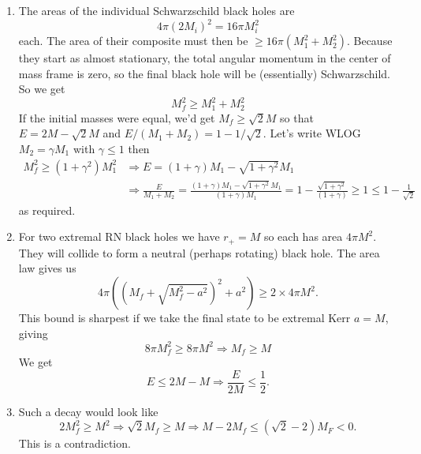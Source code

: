 \documentclass[11pt, class=article, crop=false]{standalone}
\begin{document}
\begin{enumerate}
	\begin{enumerate}
		\item The areas of the individual Schwarzschild black holes are 
	\[
		4 \pi (2 M_i)^2 = 16 \pi M_i^2
	\]
	each. The area of their composite must then be $\geq 16 \pi (M_1^2 + M_2^2)$. Because they start as almost stationary, the total angular momentum in the center of mass frame is zero, so the final black hole will be (essentially) Schwarzschild. So we get 
	\[
		M_f^2 \geq M_1^2 + M_2^2
	\]
	If the initial masses were equal, we'd get $M_f \geq \sqrt{2} M$ so that $E = 2 M - \sqrt 2 M$ and $E/(M_1 + M_2) = 1- 1/\sqrt{2}$. Let's write WLOG $M_2 = \gamma M_1$ with $\gamma \leq 1$ then 
	\[
	\begin{aligned}
		M_f^2 \geq (1+\gamma^2) M_1^2  &\Rightarrow E = (1+\gamma) M_1 - \sqrt{1+\gamma^2} M_1\\ 
		&\Rightarrow \frac{E}{M_1 + M_2} = \frac{(1+\gamma) M_1 - \sqrt{1+\gamma^2} M_1}{(1+\gamma) M_1} = 1 -\frac{\sqrt{1+\gamma^2}}{(1+\gamma)} \geq 1 \leq 1 - \frac{1}{\sqrt 2}
	\end{aligned}
	\]
	as required. 
	\item For two extremal RN black holes we have $r_+ = M$ so each has area $4 \pi M^2$. They will collide to form a neutral (perhaps rotating) black hole. The area law gives us 
	\[
		4 \pi ((M_f + \sqrt{M_f^2 - a^2})^2 + a^2) \geq 2 \times 4 \pi M^2.
	\]
	This bound is sharpest if we take the final state to be extremal Kerr $a = M$, giving
	\[
		 8 \pi M_f^2 \geq 8 \pi M^2 \Rightarrow M_f \geq M
	\]
	We get 
	\[
		E \leq 2M - M \Rightarrow \frac{E}{2M} \leq \frac12.
	\]
	
	\item Such a decay would look like 
	\[
		2 M_f^2  \geq M^2 \Rightarrow \sqrt{2} M_f \geq M  \Rightarrow M - 2 M_f \leq (\sqrt{2} - 2) M_F < 0.
	\]
	This is a contradiction. 
	\end{enumerate}
	

\end{enumerate}
\end{document}
